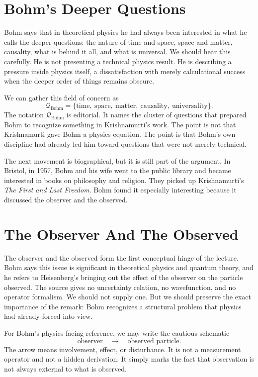 \section{Bohm's Deeper Questions}

Bohm says that in theoretical physics he had always been interested in what he calls the deeper questions: the nature of time and space, space and matter, causality, what is behind it all, and what is universal. We should hear this carefully. He is not presenting a technical physics result. He is describing a pressure inside physics itself, a dissatisfaction with merely calculational success when the deeper order of things remains obscure.

We can gather this field of concern as
\begin{equation}
\mathcal{Q}_{\mathrm{Bohm}}
=
\{\text{time},\ \text{space},\ \text{matter},\ \text{causality},\ \text{universality}\}.
\end{equation}
The notation \(\mathcal{Q}_{\mathrm{Bohm}}\) is editorial. It names the cluster of questions that prepared Bohm to recognize something in Krishnamurti's work. The point is not that Krishnamurti gave Bohm a physics equation. The point is that Bohm's own discipline had already led him toward questions that were not merely technical.

The next movement is biographical, but it is still part of the argument. In Bristol, in 1957, Bohm and his wife went to the public library and became interested in books on philosophy and religion. They picked up Krishnamurti's \emph{The First and Last Freedom}. Bohm found it especially interesting because it discussed the observer and the observed.

\section{The Observer And The Observed}

The observer and the observed form the first conceptual hinge of the lecture. Bohm says this issue is significant in theoretical physics and quantum theory, and he refers to Heisenberg's bringing out the effect of the observer on the particle observed. The source gives no uncertainty relation, no wavefunction, and no operator formalism. We should not supply one. But we should preserve the exact importance of the remark: Bohm recognizes a structural problem that physics had already forced into view.

For Bohm's physics-facing reference, we may write the cautious schematic
\begin{equation}
\text{observer}
\quad\longrightarrow\quad
\text{observed particle}.
\end{equation}
The arrow means involvement, effect, or disturbance. It is not a measurement operator and not a hidden derivation. It simply marks the fact that observation is not always external to what is observed.


